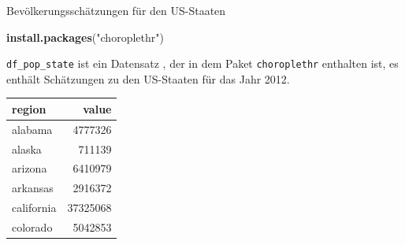 \documentclass[ignorenonframetext,]{beamer}
\newenvironment{Shaded}{\begin{snugshade}}{\end{snugshade}}
\newcommand{\KeywordTok}[1]{\textcolor[rgb]{0.13,0.29,0.53}{\textbf{#1}}}
\newcommand{\NormalTok}[1]{#1}
\newcommand{\StringTok}[1]{\textcolor[rgb]{0.31,0.60,0.02}{#1}}
\begin{document}
\begin{frame}[fragile]{Bevölkerungsschätzungen für den US-Staaten}
\protect\hypertarget{bevolkerungsschatzungen-fur-den-us-staaten}{}

\begin{Shaded}
\begin{Highlighting}[]
\KeywordTok{install.packages}\NormalTok{(}\StringTok{"choroplethr"}\NormalTok{)}
\end{Highlighting}
\end{Shaded}

\texttt{df\_pop\_state} ist ein Datensatz , der in dem Paket
\texttt{choroplethr} enthalten ist, es enthält Schätzungen zu den
US-Staaten für das Jahr 2012.

\begin{longtable}[]{@{}lr@{}}
\toprule
region & value\tabularnewline
\midrule
\endhead
alabama & 4777326\tabularnewline
alaska & 711139\tabularnewline
arizona & 6410979\tabularnewline
arkansas & 2916372\tabularnewline
california & 37325068\tabularnewline
colorado & 5042853\tabularnewline
\bottomrule
\end{longtable}

\end{frame}
\end{document}
